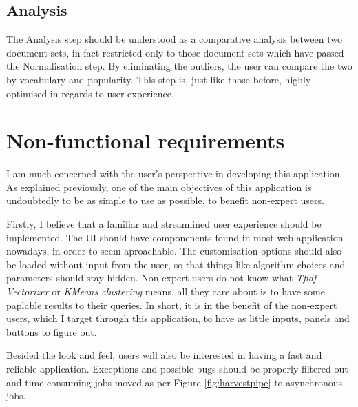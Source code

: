 \subsection{Analysis}
The Analysis step should be understood as a comparative analysis between two document sets, in fact restricted only to those document sets which have passed the Normalisation step. By eliminating the outliers, the user can compare the two by vocabulary and popularity. This step is, just like those before, highly optimised in regards to user experience.

\section{Non-functional requirements}
I am much concerned with the user's perspective in developing this application. As explained previously, one of the main objectives of this application is undoubtedly to be as simple to use as possible, to benefit non-expert users.

Firstly, I believe that a familiar and streamlined user experience should be implemented. The UI should have componenents found in most web application nowadays, in order to seem aproachable. The customisation options should also be loaded without input from the user, so that things like algorithm choices and parameters should stay hidden. Non-expert users do not know what \emph{Tfidf Vectorizer} or \emph{KMeans clustering} means, all they care about is to have some paplable results to their queries. In short, it is in the benefit of the non-expert users, which I target through this application, to have as little inputs, panels and buttons to figure out.

Besided the look and feel, users will also be interested in having a fast and reliable application. Exceptions and possible bugs should be properly filtered out and time-consuming jobs moved as per Figure \ref{fig:harvestpipe} to asynchronous jobs.